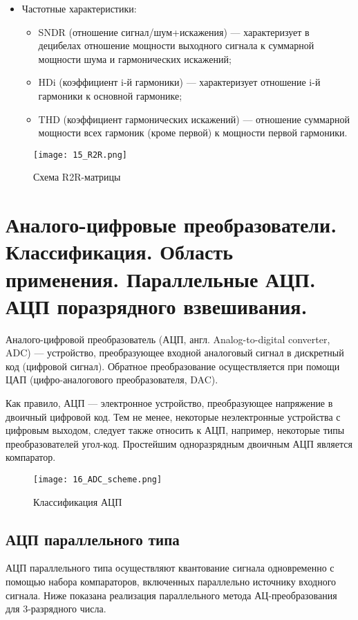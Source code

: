 \begin{itemize}
\item Частотные характеристики:
	\begin{itemize}
	\item SNDR (отношение сигнал/шум+искажения) --- характеризует в децибелах отношение мощности выходного сигнала к суммарной мощности шума и гармонических искажений;
	\item HDi (коэффициент i-й гармоники) --- характеризует отношение i-й гармоники к основной гармонике;
	\item THD (коэффициент гармонических искажений) --- отношение суммарной мощности всех гармоник (кроме первой) к мощности первой гармоники.
	\end{itemize}
\end{itemize}

\begin{figure}[H]
\centering
\texttt{[image: 15\_R2R.png]}
\caption{Схема R2R-матрицы}
\label{fig:15_R2R}
\end{figure}


\section{Аналого-цифровые преобразователи. Классификация. Область применения. Параллельные АЦП. АЦП поразрядного взвешивания.}

Аналого-цифровой преобразователь (АЦП, англ. Analog-to-digital converter, ADC) --- устройство, преобразующее входной аналоговый сигнал в дискретный код (цифровой сигнал). Обратное преобразование осуществляется при помощи ЦАП (цифро-аналогового преобразователя, DAC).

Как правило, АЦП --- электронное устройство, преобразующее напряжение в двоичный цифровой код. Тем не менее, некоторые неэлектронные устройства с цифровым выходом, следует также относить к АЦП, например, некоторые типы преобразователей угол-код. Простейшим одноразрядным двоичным АЦП является компаратор.

\begin{figure}[H]
\centering
\texttt{[image: 16\_ADC\_scheme.png]}
\caption{Классификация АЦП}
\label{fig:16_ADC_scheme}
\end{figure}

\subsection*{АЦП параллельного типа}
АЦП параллельного типа осуществляют квантование сигнала одновременно с помощью набора компараторов, включенных параллельно источнику входного сигнала. Ниже показана реализация параллельного метода АЦ-преобразования для 3-разрядного числа.

